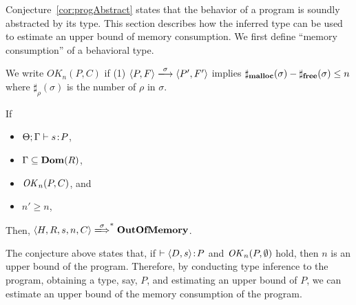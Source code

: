 Conjecture~\ref{cor:progAbstract} states that the behavior of a program
is soundly abstracted by its type.  This section describes how the
inferred type can be used to estimate an upper bound of memory
consumption.  We first define ``memory consumption'' of a behavioral
type.

\begin{myDef}
\label{df:okn} We write \(OK_n(P, C)\) if (1) \(\langle P, F \rangle
\xlongrightarrow{\sigma} \langle P', F'\rangle \) implies
\(\sharp_{\mathbf{malloc}}(\sigma) - \sharp_{\mathbf{free}}(\sigma) \le n\) where
$\sharp_\rho(\sigma)$ is the number of $\rho$ in $\sigma$.
\end{myDef}

\begin{conjecture}
\label{lem:immediateSafety}
If
 \begin{itemize}
  \item $\Theta;\Gamma \vdash s \!:\! P$,
  \item $\Gamma \subseteq \mathbf{Dom}(R)$,
  \item $\mathit{OK}_n(P,C)$, and
  \item $n' \ge n$,
 \end{itemize}
 Then, \(\langle H, R, s, n, C \rangle \xLongrightarrow{\sigma}^* \OVERFLOW \).
\end{conjecture}

The conjecture above states that, if $\vdash \langle D, s \rangle \!:\!
P$ and $\mathit{OK}_n(P,\emptyset)$ hold, then $n$ is an upper bound of the
program.  Therefore, by conducting type inference to the program,
obtaining a type, say, $P$, and estimating an upper bound of $P$, we can
estimate an upper bound of the memory consumption of the program.








